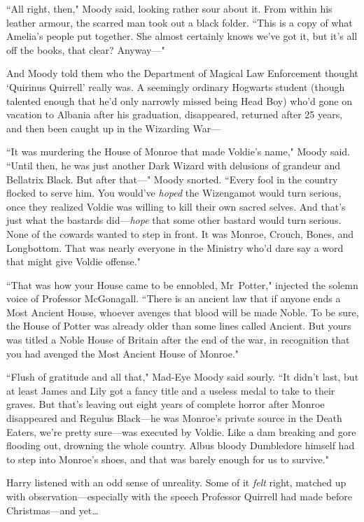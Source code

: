 ``All right, then," Moody said, looking rather sour about it. From within his leather armour, the scarred man took out a black folder. ``This is a copy of what Amelia's people put together. She almost certainly knows we've got it, but it's all off the books, that clear? Anyway—"

And Moody told them who the Department of Magical Law Enforcement thought `Quirinus Quirrell' really was. A seemingly ordinary Hogwarts student (though talented enough that he'd only narrowly missed being Head Boy) who'd gone on vacation to Albania after his graduation, disappeared, returned after 25 years, and then been caught up in the Wizarding War—

``It was murdering the House of Monroe that made Voldie's name," Moody said. ``Until then, he was just another Dark Wizard with delusions of grandeur and Bellatrix Black. But after that—" Moody snorted. ``Every fool in the country flocked to serve him. You would've \emph{hoped} the Wizengamot would turn serious, once they realized Voldie was willing to kill their own sacred selves. And that's just what the bastards did—\emph{hope} that some other bastard would turn serious. None of the cowards wanted to step in front. It was Monroe, Crouch, Bones, and Longbottom. That was nearly everyone in the Ministry who'd dare say a word that might give Voldie offense."

``That was how your House came to be ennobled, Mr~Potter," injected the solemn voice of Professor McGonagall. ``There is an ancient law that if anyone ends a Most Ancient House, whoever avenges that blood will be made Noble. To be sure, the House of Potter was already older than some lines called Ancient. But yours was titled a Noble House of Britain after the end of the war, in recognition that you had avenged the Most Ancient House of Monroe."

``Flush of gratitude and all that," Mad-Eye Moody said sourly. ``It didn't last, but at least James and Lily got a fancy title and a useless medal to take to their graves. But that's leaving out eight years of complete horror after Monroe disappeared and Regulus Black—he was Monroe's private source in the Death Eaters, we're pretty sure—was executed by Voldie. Like a dam breaking and gore flooding out, drowning the whole country. Albus bloody Dumbledore himself had to step into Monroe's shoes, and that was barely enough for us to survive."

Harry listened with an odd sense of unreality. Some of it \emph{felt} right, matched up with observation—especially with the speech Professor Quirrell had made before Christmas—and yet{\ldots}

